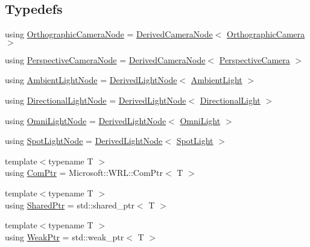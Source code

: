\subsection*{Typedefs}
\begin{DoxyCompactItemize}
\item 
using \hyperlink{namespacemage_a7d62ab5877be3e14a9735014b77d3f55}{Orthographic\+Camera\+Node} = \hyperlink{classmage_1_1_derived_camera_node}{Derived\+Camera\+Node}$<$ \hyperlink{classmage_1_1_orthographic_camera}{Orthographic\+Camera} $>$
\item 
using \hyperlink{namespacemage_ad6f2ef4a25873e73e8fa38b06425939f}{Perspective\+Camera\+Node} = \hyperlink{classmage_1_1_derived_camera_node}{Derived\+Camera\+Node}$<$ \hyperlink{classmage_1_1_perspective_camera}{Perspective\+Camera} $>$
\item 
using \hyperlink{namespacemage_ab0783a7428706251f8561dc30a4d228d}{Ambient\+Light\+Node} = \hyperlink{classmage_1_1_derived_light_node}{Derived\+Light\+Node}$<$ \hyperlink{classmage_1_1_ambient_light}{Ambient\+Light} $>$
\item 
using \hyperlink{namespacemage_a7637b5351fc0f66a10badd80ebb35899}{Directional\+Light\+Node} = \hyperlink{classmage_1_1_derived_light_node}{Derived\+Light\+Node}$<$ \hyperlink{classmage_1_1_directional_light}{Directional\+Light} $>$
\item 
using \hyperlink{namespacemage_a1724c6e6b6b5ba535cdd967cbbb4a669}{Omni\+Light\+Node} = \hyperlink{classmage_1_1_derived_light_node}{Derived\+Light\+Node}$<$ \hyperlink{classmage_1_1_omni_light}{Omni\+Light} $>$
\item 
using \hyperlink{namespacemage_aeed5dee4ff6c591eabb0e9114256df4a}{Spot\+Light\+Node} = \hyperlink{classmage_1_1_derived_light_node}{Derived\+Light\+Node}$<$ \hyperlink{classmage_1_1_spot_light}{Spot\+Light} $>$
\item 
{\footnotesize template$<$typename T $>$ }\\using \hyperlink{namespacemage_ae74f374780900893caa5555d1031fd79}{Com\+Ptr} = Microsoft\+::\+W\+R\+L\+::\+Com\+Ptr$<$ T $>$
\item 
{\footnotesize template$<$typename T $>$ }\\using \hyperlink{namespacemage_a1e01ae66713838a7a67d30e44c67703e}{Shared\+Ptr} = std\+::shared\+\_\+ptr$<$ T $>$
\item 
{\footnotesize template$<$typename T $>$ }\\using \hyperlink{namespacemage_aa159a63c0d58464bdf32dfe419dd5dc1}{Weak\+Ptr} = std\+::weak\+\_\+ptr$<$ T $>$

\end{DoxyCompactItemize}
